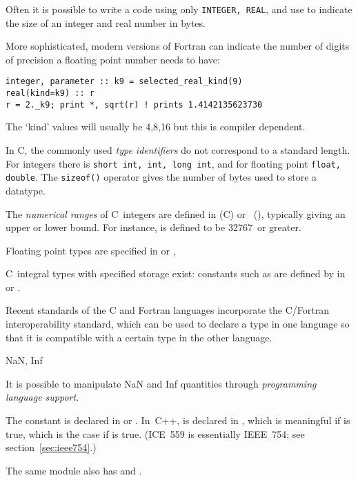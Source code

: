 Often it is possible to write a code using only \texttt{INTEGER,
  REAL}, and use  to indicate the size
of an integer and real number in bytes.

More sophisticated, modern versions of Fortran can indicate the number
of digits of precision a floating point number needs to have:
\begin{verbatim}
integer, parameter :: k9 = selected_real_kind(9)
real(kind=k9) :: r
r = 2._k9; print *, sqrt(r) ! prints 1.4142135623730
\end{verbatim}
The `kind' values will usually be 4,8,16 but this is compiler
dependent.

%
In C, the commonly used
%
\emph{type identifiers}
%
do not correspond to a standard length. For integers there
is \texttt{short int, int, long int}, and for floating point
\texttt{float, double}. The \texttt{sizeof()} operator gives the
number of bytes used to store a datatype.

The \emph{numerical ranges}
of C~integers are defined in  (C) or
~(), typically giving an upper or lower bound.
For instance,  is defined to be 32767~or greater.

Floating point types are specified in  or ,

C~integral types with specified storage exist: constants such as
 are defined by  in  or
.

%
Recent standards of the C and Fortran
languages incorporate the C/Fortran interoperability standard, which
can be used to declare a type in one language so that it is compatible
with a certain type in the other language.

 {NaN, Inf}

It is possible to manipulate NaN and Inf quantities through
\emph{programming language support}.

The constant  is declared in  or .
%
In~C++,  is declared in
, which is meaningful if
 is true, which is the case if
 is true. (ICE~559 is essentially
IEEE~754; see section~\ref{sec:ieee754}.)

The same module also has  and .

